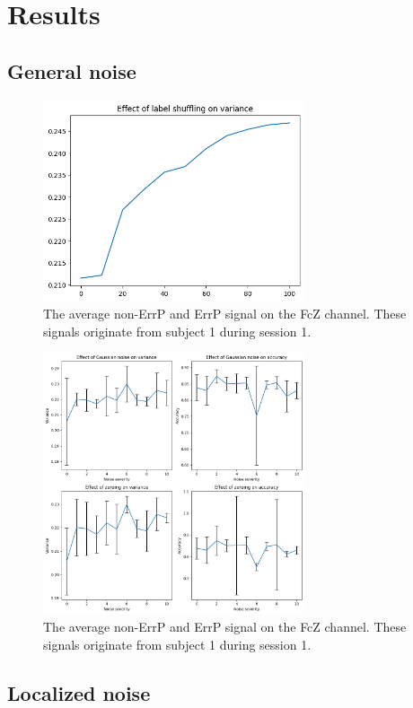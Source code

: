 \section{Results}\label{sec:results}

\subsection{General noise}

\begin{figure}[!tbp]
    \centering
        \includegraphics[width=7.7cm]{img/label_shuffle.png}
    \caption{The average non-ErrP and ErrP signal on the FcZ channel. These signals originate from subject 1 during session 1.}
    \label{fig:label_shuffle}
\end{figure}

\begin{figure}[!tbp]
    \centering
        \includegraphics[width=7.7cm]{img/general.png}
    \caption{The average non-ErrP and ErrP signal on the FcZ channel. These signals originate from subject 1 during session 1.}
    \label{fig:general}
\end{figure}

\subsection{Localized noise}

